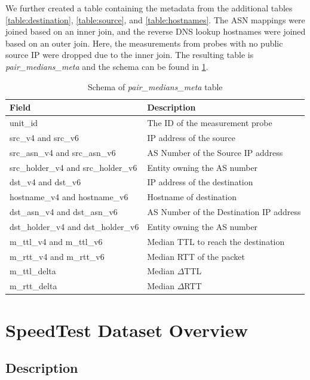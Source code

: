 \FloatBarrier

We further created a table containing the metadata from the additional tables \cref{table:destination}, \cref{table:source}, and  \cref{table:hostnames}. The ASN mappings were joined based on an inner join, and the reverse DNS lookup hostnames were joined based on an outer join. Here, the measurements from probes with no public source IP were dropped due to the inner join. The resulting table is \textit{pair\_medians\_meta} and the schema can be found in \cref{table:pairmeta}.  

\begin{table}[!h]
	\centering
	\caption{Schema of \textit{pair\_medians\_meta} table}
	\label{table:pairmeta}
	\begin{tabular}{lp{8cm}}
  		\toprule
  		\textbf{Field} & \textbf{Description} \\ 
  		\midrule
  		unit\_id & The ID of the measurement probe \\ 
		src\_v4 and src\_v6 &  IP address of the source \\
		src\_asn\_v4 and src\_asn\_v6 & AS Number of the Source IP address \\
		src\_holder\_v4 and src\_holder\_v6 & Entity owning the AS number \\ 
		dst\_v4 and dst\_v6 & IP address of the destination \\
		hostname\_v4 and hostname\_v6 & Hostname of destination \\ 
		dst\_asn\_v4 and dst\_asn\_v6 & AS Number of the Destination IP address \\
		dst\_holder\_v4 and dst\_holder\_v6 & Entity owning the AS number  \\
		m\_ttl\_v4 and m\_ttl\_v6 & Median TTL to reach the destination \\ 
		m\_rtt\_v4 and m\_rtt\_v6 & Median RTT of the packet \\
		m\_ttl\_delta & Median $\Delta$TTL \\
		m\_rtt\_delta & Median $\Delta$RTT \\
  		\bottomrule
\end{tabular}
\end{table}

\FloatBarrier

\section{SpeedTest Dataset Overview}

\subsection*{Description}

